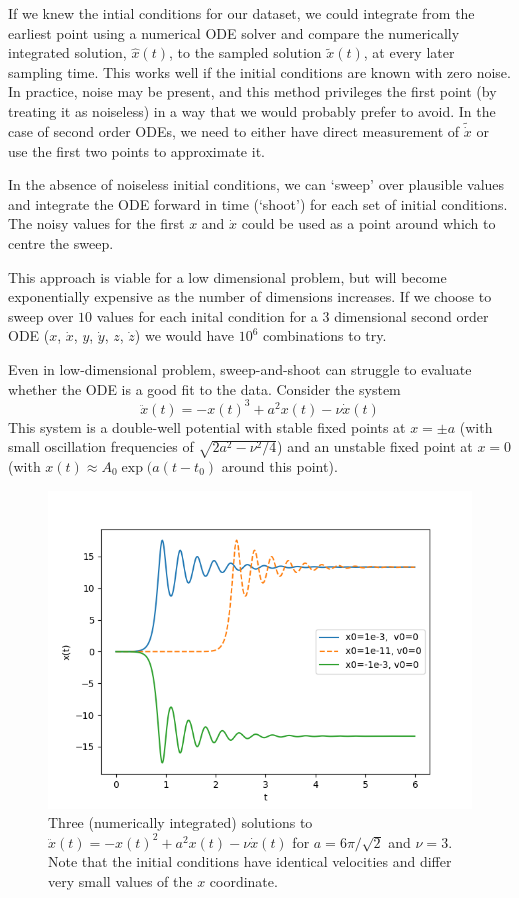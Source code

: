 \documentclass{article}
\begin{document}
If we knew the intial conditions for our dataset, we could integrate from the earliest point using a numerical ODE solver and compare the numerically integrated solution, $\hat{x}(t)$, to the sampled solution $\tilde{x}(t)$, at every later sampling time.
This works well if the initial conditions are known with zero noise.
In practice, noise may be present, and this method privileges the first point (by treating it as noiseless) in a way that we would probably prefer to avoid.
In the case of second order ODEs, we need to either have direct measurement of $\tilde{\dot{x}}$ or use the first two points to approximate it.

In the absence of noiseless initial conditions, we can `sweep' over plausible values and integrate the ODE forward in time (`shoot') for each set of initial conditions.
The noisy values for the first $x$ and $\dot{x}$ could be used as a point around which to centre the sweep.

This approach is viable for a low dimensional problem, but will become exponentially expensive as the number of dimensions increases.
If we choose to sweep over $10$ values for each inital condition for a 3 dimensional second order ODE ($x$, $\dot{x}$, $y$, $\dot{y}$, $z$, $\dot{z}$) we would have $10^6$ combinations to try.

Even in low-dimensional problem, sweep-and-shoot can struggle to evaluate whether the ODE is a good fit to the data. Consider the system
$$
\ddot{x}(t) = - x(t)^3 + a^2 x(t) - \nu \dot{x}(t)
$$
This system is a double-well potential with stable fixed points at $x = \pm a$ (with small oscillation frequencies of $\sqrt{2 a^2 - \nu^2/4}$) and an unstable fixed point at $x=0$ (with $x(t) \approx A_0 \exp(a (t - t_0)$ around this point).

\begin{figure}
\includegraphics{images/alternative_methods/double_well.png}
\centering
\caption{
Three (numerically integrated) solutions to $\ddot{x}(t) = -x(t)^2 + a^2 x(t) - \nu \dot{x}(t)$ for $a = 6\pi / \sqrt{2}$ and $\nu = 3$.
Note that the initial conditions have identical velocities and differ very small values of the $x$ coordinate.
}
\label{fig:double_well}
\end{figure}
\end{document}
